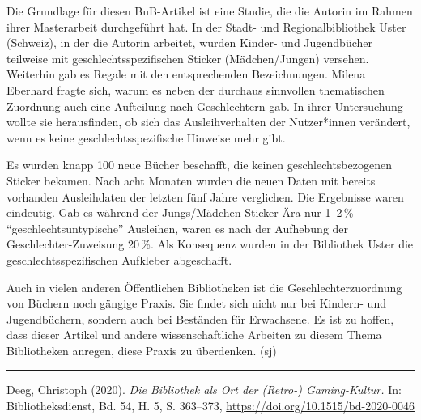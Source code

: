 \documentclass[a4paper,
fontsize=11pt,
oneside,
numbers=noperiodatend,
parskip=half-,
bibliography=totoc,
final
]{scrartcl}
\begin{document}
Die Grundlage für diesen BuB-Artikel ist eine Studie, die die Autorin im
Rahmen ihrer Masterarbeit durchgeführt hat. In der Stadt- und
Regionalbibliothek Uster (Schweiz), in der die Autorin arbeitet, wurden
Kinder- und Jugendbücher teilweise mit geschlechtsspezifischen Sticker
(Mädchen/Jungen) versehen. Weiterhin gab es Regale mit den
entsprechenden Bezeichnungen. Milena Eberhard fragte sich, warum es
neben der durchaus sinnvollen thematischen Zuordnung auch eine
Aufteilung nach Geschlechtern gab. In ihrer Untersuchung wollte sie
herausfinden, ob sich das Ausleihverhalten der Nutzer*innen verändert,
wenn es keine geschlechtsspezifische Hinweise mehr gibt.

Es wurden knapp 100 neue Bücher beschafft, die keinen
geschlechtsbezogenen Sticker bekamen. Nach acht Monaten wurden die neuen
Daten mit bereits vorhanden Ausleihdaten der letzten fünf Jahre
verglichen. Die Ergebnisse waren eindeutig. Gab es während der
Jungs/Mädchen-Sticker-Ära nur 1--2\,\% \enquote{geschlechtsuntypische}
Ausleihen, waren es nach der Aufhebung der Geschlechter-Zuweisung 20\,\%.
Als Konsequenz wurden in der Bibliothek Uster die
geschlechtsspezifischen Aufkleber abgeschafft.

Auch in vielen anderen Öffentlichen Bibliotheken ist die
Geschlechterzuordnung von Büchern noch gängige Praxis. Sie findet sich
nicht nur bei Kindern- und Jugendbüchern, sondern auch bei Beständen für
Erwachsene. Es ist zu hoffen, dass dieser Artikel und andere
wissenschaftliche Arbeiten zu diesem Thema Bibliotheken anregen, diese
Praxis zu überdenken. (sj)

\begin{center}\rule{0.5\linewidth}{0.5pt}\end{center}

Deeg, Christoph (2020). \emph{Die Bibliothek als Ort der (Retro-)
Gaming-Kultur.} In: Bibliotheksdienst, Bd. 54, H. 5, S. 363--373,
\url{https://doi.org/10.1515/bd-2020-0046}
\end{document}
